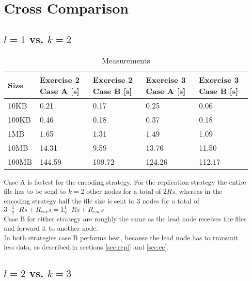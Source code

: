 \section{Cross Comparison} \label{sec:comp}

\subsection*{$l = 1$ vs. $k = 2$}

\begin{table}[H]
    \begin{tabularx}{\textwidth}{|X|X|X|X|X|}
        \hline
        \cellcolor{lightgray}\textbf{Size} & \cellcolor{lightgray}\textbf{Exercise 2 Case A [s]} & \cellcolor{lightgray}\textbf{Exercise 2 Case B [s]} & \cellcolor{lightgray}\textbf{Exercise 3 Case A [s]} & \cellcolor{lightgray}\textbf{Exercise 3 Case B [s]}  \\\hline
        10KB  & 0.21    & 0.17   & 0.25   & 0.06   \\\hline
        100KB & 0.46    & 0.18   & 0.37   & 0.18   \\\hline
        1MB   & 1.65    & 1.31   & 1.49   & 1.09   \\\hline
        10MB  & 14.31   & 9.59   & 13.76  & 11.50  \\\hline
        100MB & 144.59  & 109.72 & 124.26 & 112.17 \\\hline
    \end{tabularx}
    \caption{Measurements}
	\label{tab:e2meas}
\end{table}

Case A is fastest for the encoding strategy. For the replication strategy the entire file has to be send to $k=2$ other nodes for a total of $2Rs$, whereas in the encoding strategy half the file size is sent to 3 nodes for a total of $3 \cdot \frac{1}{2} \cdot Rs + R_{enc}s = 1\frac{1}{2} \cdot Rs + R_{enc}s$ \\
Case B for either strategy are roughly the same as the lead node receives the files and forward it to another node. \\
In both strategies case B performs best, because the lead node has to transmit less data, as described in sections \ref{sec:repl} and \ref{sec:ec}.

\subsection*{$l = 2$ vs. $k = 3$}

